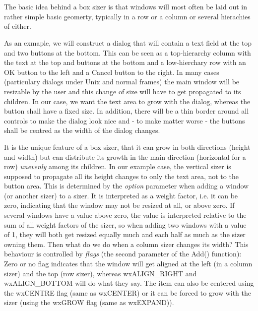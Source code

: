 \section{}\label{wxboxsizer}

The basic idea behind a box sizer is that windows will most often be laid out in rather 
simple basic geomerty, typically in a row or a column or several hierachies of either.

As an exmaple, we will construct a dialog that will contain a text field at the top and
two buttons at the bottom. This can be seen as a top-hierarchy column with the text at
the top and buttons at the bottom and a low-hierchary row with an OK button to the left
and a Cancel button to the right. In many cases (particulary dialogs under Unix and
normal frames) the main window will be resizable by the user and this change of size
will have to get propagated to its children. In our case, we want the text area to grow
with the dialog, whereas the button shall have a fixed size. In addition, there will be
a thin border around all controls to make the dialog look nice and - to make matter worse -
the buttons shall be centred as the width of the dialog changes.

It is the unique feature of a box sizer, that it can grow in both directions (height and
width) but can distribute its growth in the main direction (horizontal for a row) {\it unevenly}
among its children. In our example case, the vertical sizer is supposed to propagate all its
height changes to only the text area, not to the button area. This is determined by the {\it option} parameter
when adding a window (or another sizer) to a sizer. It is interpreted
as a weight factor, i.e. it can be zero, indicating that the window may not be resized
at all, or above zero. If several windows have a value above zero, the value is interpreted
relative to the sum of all weight factors of the sizer, so when adding two windows with
a value of 1, they will both get resized equally much and each half as much as the sizer 
owning them. Then what do we do when a column sizer changes its width? This behaviour is
controlled by {\it flags} (the second parameter of the Add() function): Zero or no flag indicates that
the window will get aligned at the left (in a column sizer) and the top (row sizer), whereas
wxALIGN\_RIGHT and wxALIGN\_BOTTOM will do what they say. The item can also be centered
using the wxCENTRE flag (same as wxCENTER) or it can be forced to grow with the sizer (using
the wxGROW flag (same as wxEXPAND)).

